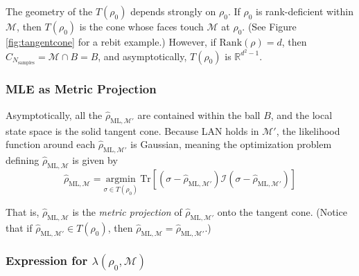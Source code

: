 \documentclass[aps,pra, twocolumn]{revtex4-1}
\newcommand{\M}{\mathcal{M}}
\newcommand{\rhohat}{\hat{\rho}}
\newcommand{\rhoML}[1]{\rhohat_{\scriptscriptstyle{\mathrm{ML},#1}}}
\begin{document}
The geometry of the $T(\rho_{0})$ depends strongly on $\rho_{0}$. If $\rho_{0}$ is rank-deficient within $\M$, then $T(\rho_{0})$ is the cone whose faces touch $\M$ at $\rho_{0}$. (See Figure \ref{fig:tangentcone} for a rebit example.) However, if $\mathrm{Rank}(\rho)  = d$, then $C_{N_{\mathrm{samples}}} = \M \cap B = B$, and asymptotically, $T(\rho_{0})$ is $\mathbb{R}^{d^{2}-1}$.

\subsubsection{MLE as Metric Projection}

Asymptotically, all the $\rhoML{\M'}$ are contained within the ball $B$, and the local state space is the solid tangent cone. Because LAN holds in $\M'$, the likelihood function around each $\rhoML{\M'}$ is Gaussian, meaning the optimization problem defining $\rhoML{\M}$ is given by \begin{equation}
\label{eq:lampnmle2}
\rhoML{\M} = \underset{\sigma \in T(\rho_{0})}{\text{argmin}}~\mathrm{Tr}[(\sigma  -\rhoML{\M'})\mathcal{I}(\sigma  -\rhoML{\M'})]
\end{equation}

That is, $\rhoML{\M}$ is the \emph{metric projection} of $\rhoML{\M'}$ onto the tangent cone. (Notice that if $\rhoML{\M'} \in T(\rho_{0})$, then $\rhoML{\M} = \rhoML{\M'}$.)

\subsubsection{Expression for $\lambda(\rho_{0}, \M)$}
\end{document}
